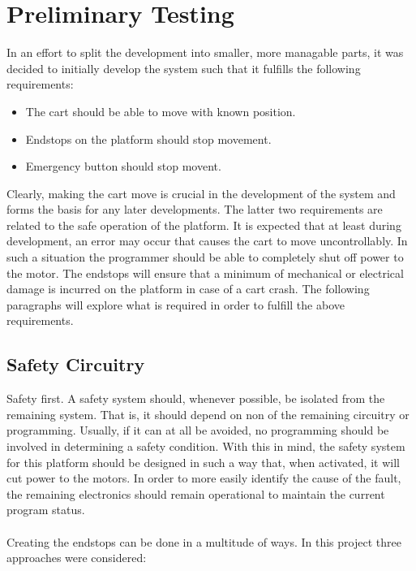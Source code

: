 \section{Preliminary Testing} %
\label{sec:preliminary_testing}
In an effort to split the development into smaller, more managable parts, it was decided to initially develop the system such that it fulfills the following requirements:

\begin{itemize}
	\item The cart should be able to move with known position.
	\item Endstops on the platform should stop movement.
	\item Emergency button should stop movent.
\end{itemize}

Clearly, making the cart move is crucial in the development of the system and forms the basis for any later developments.
The latter two requirements are related to the safe operation of the platform.
It is expected that at least during development, an error may occur that causes the cart to move uncontrollably.
In such a situation the programmer should be able to completely shut off power to the motor.
The endstops will ensure that a minimum of mechanical or electrical damage is incurred on the platform in case of a cart crash.
The following paragraphs will explore what is required in order to fulfill the above requirements.
\subsection{Safety Circuitry} %
\label{sub:safety_circuitry}
Safety first.
A safety system should, whenever possible, be isolated from the remaining system.
That is, it should depend on non of the remaining circuitry or programming.
Usually, if it can at all be avoided, no programming should be involved in determining a safety condition.
With this in mind, the safety system for this platform should be designed in such a way that, when activated, it will cut power to the motors.
In order to more easily identify the cause of the fault, the remaining electronics should remain operational to maintain the current program status.
\\~\\
Creating the endstops can be done in a multitude of ways.
In this project three approaches were considered:
